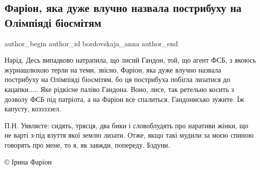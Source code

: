  
 
 
 
 
 
\subsection{Фаріон, яка дуже влучно назвала пострибуху на Олімпіяді біосмітям}
\label{sec:11_08_2021.fb.bordovskaja_anna.1.farion_maguchih_gordon}
 
\ifcmt
 author_begin
   author_id bordovskaja_anna
 author_end
\fi

Нарід. Десь випадково натрапила, що лисий Гандон, той, що агент ФСБ, з якоюсь
журнашлюхою терли на теми, звісно, Фаріон, яка дуже влучно назвала пострибуху
на Олімпіяді біосмітям, бо ця пострибуха побігла лизатися до кацапки..... Яке
рідкісне паліво Гандона. Воно, лисе, так ретельно косить з дозволу ФСБ під
патріота, а на Фаріон все спалиться. Гандонисько зужите. Їж капусту, козззззел.

П.Н. Уявляєте: сидять, трясця, два бики і словоблудять про наративи жінки, що
не варті з-під взуття якої землю лизати. Отже, якщо такі мудили за моєю спиною
говорять про мене, то я, як завжди, попереду. Бздуни.

© Ірина Фаріон

